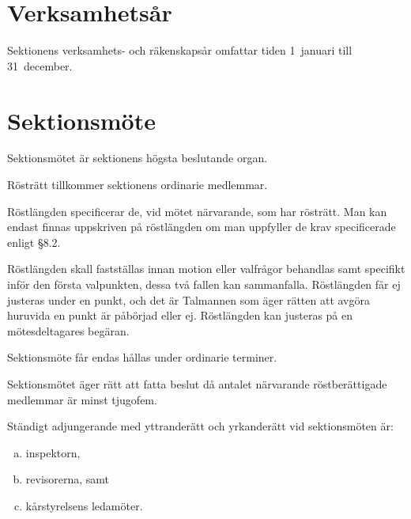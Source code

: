 \documentclass[stadgar]{dsekprotokoll}
\begin{document}
\section{Verksamhetsår}

\begin{stadgeavsnitt}


Sektionens verksamhets- och räkenskapsår omfattar tiden 1~januari till
31~december.

\end{stadgeavsnitt}

\section{Sektionsmöte}

\begin{stadgeavsnitt}


Sektionsmötet är sektionens högsta beslutande organ.


Rösträtt tillkommer sektionens ordinarie medlemmar.


Röstlängden specificerar de, vid mötet närvarande, som har rösträtt. Man kan endast finnas uppskriven på röstlängden om man uppfyller de krav specificerade enligt §8.2.

Röstlängden skall fastställas innan motion eller valfrågor behandlas samt specifikt inför den första valpunkten, dessa två fallen kan sammanfalla. Röstlängden får ej justeras under en punkt, och det är Talmannen som äger rätten att avgöra huruvida en punkt är påbörjad eller ej. Röstlängden kan justeras på en mötesdeltagares begäran.

Sektionsmöte får endas hållas under ordinarie terminer.


Sektionsmötet äger rätt att fatta beslut då antalet närvarande
röstberättigade medlemmar är minst tjugofem.


Ständigt adjungerande med yttranderätt och yrkanderätt vid sektionsmöten
är:
\begin{enumerate}[a)]
\item inspektorn,
\item revisorerna, samt
\item kårstyrelsens ledamöter.
\end{enumerate}


\end{stadgeavsnitt}
\end{document}

